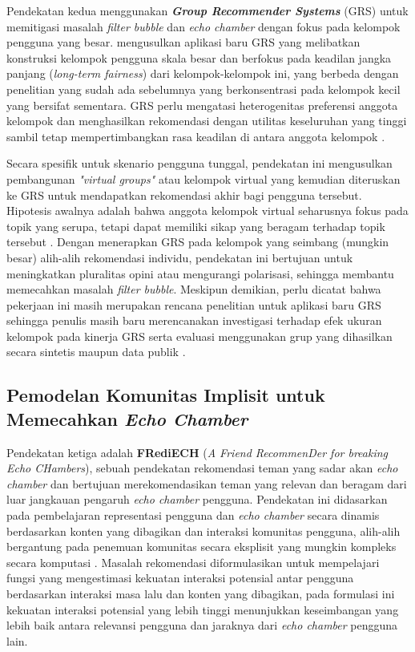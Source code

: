 Pendekatan kedua menggunakan \textbf{\textit{Group Recommender Systems}} (GRS)
untuk memitigasi masalah \textit{filter bubble} dan \textit{echo chamber} dengan
fokus pada kelompok pengguna yang besar. \textcite{Dokoupil2022} mengusulkan
aplikasi baru GRS yang melibatkan konstruksi kelompok pengguna skala besar dan
berfokus pada keadilan jangka panjang (\textit{long-term fairness}) dari
kelompok-kelompok ini, yang berbeda dengan penelitian yang sudah ada sebelumnya yang berkonsentrasi
pada kelompok kecil yang bersifat sementara. GRS perlu mengatasi heterogenitas
preferensi anggota kelompok dan menghasilkan rekomendasi dengan utilitas
keseluruhan yang tinggi sambil tetap mempertimbangkan rasa keadilan di antara
anggota kelompok \autocite{Dokoupil2022}.

Secara spesifik untuk skenario pengguna tunggal, pendekatan ini mengusulkan
pembangunan \textit{"virtual groups"} atau kelompok virtual yang kemudian
diteruskan ke GRS untuk mendapatkan rekomendasi akhir bagi pengguna tersebut.
Hipotesis awalnya adalah bahwa anggota kelompok virtual seharusnya fokus pada
topik yang serupa, tetapi dapat memiliki sikap yang beragam terhadap topik
tersebut \autocite{Dokoupil2022}. Dengan menerapkan GRS pada kelompok yang
seimbang (mungkin besar) alih-alih rekomendasi individu, pendekatan ini
bertujuan untuk meningkatkan pluralitas opini atau mengurangi polarisasi,
sehingga membantu memecahkan masalah \textit{filter bubble}. Meskipun demikian,
perlu dicatat bahwa pekerjaan ini masih merupakan rencana penelitian untuk
aplikasi baru GRS sehingga penulis masih baru merencanakan investigasi terhadap
efek ukuran kelompok pada kinerja GRS serta evaluasi menggunakan grup yang
dihasilkan secara sintetis maupun data publik \autocite{Dokoupil2022}.

\subsection{Pemodelan Komunitas Implisit untuk Memecahkan \textit{Echo Chamber}}
\label{subsec:frediech}

Pendekatan ketiga adalah \textbf{FRediECH} (\textit{A Friend RecommenDer for
breaking Echo CHambers}), sebuah pendekatan rekomendasi teman yang sadar akan
\textit{echo chamber} dan bertujuan merekomendasikan teman yang relevan dan
beragam dari luar jangkauan pengaruh \textit{echo chamber} pengguna. Pendekatan
ini didasarkan pada pembelajaran representasi pengguna dan \textit{echo chamber}
secara dinamis berdasarkan konten yang dibagikan dan interaksi komunitas pengguna,
alih-alih bergantung pada penemuan komunitas secara eksplisit yang mungkin
kompleks secara komputasi \autocite{Tommasel2021}. Masalah rekomendasi
diformulasikan untuk mempelajari fungsi yang mengestimasi kekuatan interaksi
potensial antar pengguna berdasarkan interaksi masa lalu dan konten yang
dibagikan, pada formulasi ini kekuatan interaksi potensial yang
lebih tinggi menunjukkan keseimbangan yang
lebih baik antara relevansi pengguna dan jaraknya dari \textit{echo chamber}
pengguna lain.

